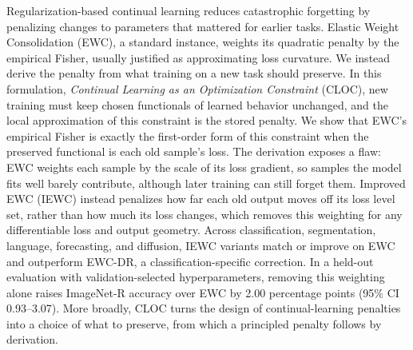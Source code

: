 Regularization-based continual learning reduces catastrophic forgetting by
penalizing changes to parameters that mattered for earlier tasks. Elastic Weight
Consolidation (EWC), a standard instance, weights its quadratic penalty by the
empirical Fisher, usually justified as approximating loss curvature. We
instead derive the penalty from what training on a new task should preserve. In
this formulation, \emph{Continual Learning as an Optimization Constraint}
(CLOC), new training must keep chosen functionals of learned behavior unchanged,
and the local approximation of this constraint is the stored penalty. We show
that EWC's empirical Fisher is exactly the first-order form of this constraint
when the preserved functional is each old sample's loss. The derivation exposes
a flaw: EWC weights each sample by the scale of its loss gradient, so samples
the model fits well barely contribute, although later training can still forget
them. Improved EWC (IEWC) instead penalizes how far each old output moves off
its loss level set, rather than how much its loss changes, which removes this
weighting for any differentiable loss and output geometry. Across
classification, segmentation, language, forecasting, and diffusion, IEWC
variants match or improve on EWC and outperform EWC-DR, a classification-specific
correction. In a held-out evaluation with
validation-selected hyperparameters, removing this weighting alone raises ImageNet-R
accuracy over EWC by 2.00 percentage points (95\% CI 0.93--3.07). More
broadly, CLOC turns the design of continual-learning penalties into a choice of
what to preserve, from which a principled penalty follows by derivation.
